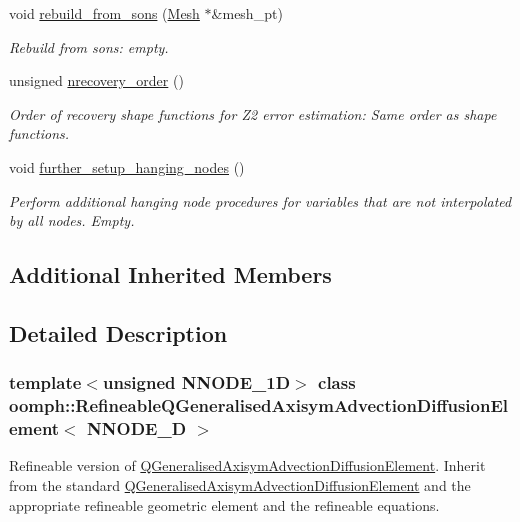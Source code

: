 \begin{DoxyCompactItemize}
void \hyperlink{classoomph_1_1RefineableQGeneralisedAxisymAdvectionDiffusionElement_aad29ba9341305fbb451f3825aa3f8d03}{rebuild\+\_\+from\+\_\+sons} (\hyperlink{classoomph_1_1Mesh}{Mesh} $\ast$\&mesh\+\_\+pt)
\begin{DoxyCompactList}\small\item\em Rebuild from sons\+: empty. \end{DoxyCompactList}\item 
unsigned \hyperlink{classoomph_1_1RefineableQGeneralisedAxisymAdvectionDiffusionElement_aea11dc4099c09941839a240a9ca1bff7}{nrecovery\+\_\+order} ()
\begin{DoxyCompactList}\small\item\em Order of recovery shape functions for Z2 error estimation\+: Same order as shape functions. \end{DoxyCompactList}\item 
void \hyperlink{classoomph_1_1RefineableQGeneralisedAxisymAdvectionDiffusionElement_aea4690891aa8c7a5d0cbb65eb101a3e9}{further\+\_\+setup\+\_\+hanging\+\_\+nodes} ()
\begin{DoxyCompactList}\small\item\em Perform additional hanging node procedures for variables that are not interpolated by all nodes. Empty. \end{DoxyCompactList}\end{DoxyCompactItemize}
\subsection*{Additional Inherited Members}


\subsection{Detailed Description}
\subsubsection*{template$<$unsigned N\+N\+O\+D\+E\+\_\+1D$>$\newline
class oomph\+::\+Refineable\+Q\+Generalised\+Axisym\+Advection\+Diffusion\+Element$<$ N\+N\+O\+D\+E\+\_\+D $>$}

Refineable version of \hyperlink{classQGeneralisedAxisymAdvectionDiffusionElement}{Q\+Generalised\+Axisym\+Advection\+Diffusion\+Element}. Inherit from the standard \hyperlink{classQGeneralisedAxisymAdvectionDiffusionElement}{Q\+Generalised\+Axisym\+Advection\+Diffusion\+Element} and the appropriate refineable geometric element and the refineable equations. 

